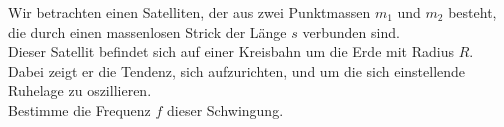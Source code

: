 \begin{Exercise}[label = gravgrad, origin = {Auswahlwettbewerb IPhO 2013, 3. Runde}, title = {Gravity Gradient Stabilization}, difficulty = 5 ]
Wir betrachten einen Satelliten, der aus zwei Punktmassen $m_1$ und $m_2$ besteht, die durch einen massenlosen Strick der Länge $s$ verbunden sind. \\
Dieser Satellit befindet sich auf einer Kreisbahn um die Erde mit Radius $R$. Dabei zeigt er die Tendenz, sich aufzurichten, und um die sich einstellende Ruhelage zu oszillieren.\\
Bestimme die Frequenz $f$ dieser Schwingung.
\end{Exercise}
\begin{Answer}[ref = gravgrad]
	
\end{Answer}